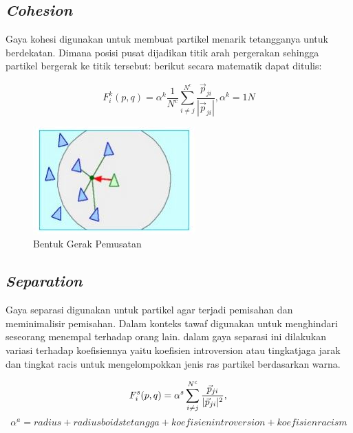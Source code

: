 \subsection{\emph{Cohesion}}\label{sec:cohesion}
\hspace{0.5cm}Gaya kohesi digunakan untuk membuat partikel menarik tetangganya untuk berdekatan\citep{Reynolds1987}. Dimana posisi pusat dijadikan titik arah pergerakan sehingga partikel bergerak ke titik tersebut: berikut secara matematik dapat ditulis:

\begin{equation}
 F_i^k(p,q) = \alpha^k \dfrac{1}{N^c}\sum^{N^c}_{i \neq j}\dfrac{\vec{p}_{ji}}{|\vec{p}_{ji}|} , \alpha^k = 1N
\end{equation}
\begin{figure}
\centering
\includegraphics[scale=0.5]{gambar/cohesion}
\caption{Bentuk Gerak Pemusatan\citep{Reynolds1987}}
\end{figure}

\subsection{\emph{Separation}}\label{sec:separation}
\hspace{0.5cm} Gaya separasi digunakan untuk partikel agar terjadi pemisahan dan meminimalisir pemisahan\citep{Reynolds1987}. Dalam konteks tawaf digunakan untuk menghindari seseorang menempal terhadap orang lain. dalam gaya separasi ini dilakukan variasi terhadap koefisiennya yaitu koefisien introversion atau tingkatjaga jarak dan tingkat racis untuk mengelompokkan jenis ras partikel berdasarkan warna.

\begin{equation}
 F_i^s(p,q) = \alpha^s \sum^{N^c}_{i \neq j}\dfrac{\vec{p}_{ji}}{|\vec{p}_{ji}|^2},\\
 \end{equation}
\begin{equation}
\alpha^a = radius + radius boids tetangga + koefisien introversion + koefisien racism
 \end{equation}

